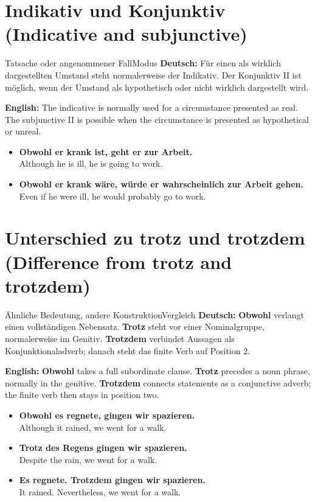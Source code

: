 \documentclass[a4paper,11pt]{article}
\newcommand{\GermanText}[1]{\textbf{Deutsch: }#1\par}
\newcommand{\EnglishText}[1]{{\small\color{SoftGray}\textbf{English: }#1\par}}
\newcommand{\ExampleItem}[2]{\item \textbf{#1}\\{\small\color{SoftGray}#2}}
\begin{document}
\section{Indikativ und Konjunktiv \textnormal{(Indicative and subjunctive)}}
\begin{grammarentry}{Tatsache oder angenommener Fall}{Modus}
\GermanText{Für einen als wirklich dargestellten Umstand steht normalerweise der Indikativ. Der Konjunktiv II ist möglich, wenn der Umstand als hypothetisch oder nicht wirklich dargestellt wird.}
\EnglishText{The indicative is normally used for a circumstance presented as real. The subjunctive II is possible when the circumstance is presented as hypothetical or unreal.}
\end{grammarentry}
\begin{exbox}\begin{itemize}
\ExampleItem{Obwohl er krank ist, geht er zur Arbeit.}{Although he is ill, he is going to work.}
\ExampleItem{Obwohl er krank wäre, würde er wahrscheinlich zur Arbeit gehen.}{Even if he were ill, he would probably go to work.}
\end{itemize}\end{exbox}

\section{Unterschied zu \glqq trotz\grqq{} und \glqq trotzdem\grqq{} \textnormal{(Difference from \glqq trotz\grqq{} and \glqq trotzdem\grqq)}}
\begin{grammarentry}{Ähnliche Bedeutung, andere Konstruktion}{Vergleich}
\GermanText{\textbf{Obwohl} verlangt einen vollständigen Nebensatz. \textbf{Trotz} steht vor einer Nominalgruppe, normalerweise im Genitiv. \textbf{Trotzdem} verbindet Aussagen als Konjunktionaladverb; danach steht das finite Verb auf Position 2.}
\EnglishText{\textbf{Obwohl} takes a full subordinate clause. \textbf{Trotz} precedes a noun phrase, normally in the genitive. \textbf{Trotzdem} connects statements as a conjunctive adverb; the finite verb then stays in position two.}
\end{grammarentry}
\begin{exbox}\begin{itemize}
\ExampleItem{Obwohl es regnete, gingen wir spazieren.}{Although it rained, we went for a walk.}
\ExampleItem{Trotz des Regens gingen wir spazieren.}{Despite the rain, we went for a walk.}
\ExampleItem{Es regnete. Trotzdem gingen wir spazieren.}{It rained. Nevertheless, we went for a walk.}
\end{itemize}\end{exbox}
\end{document}
